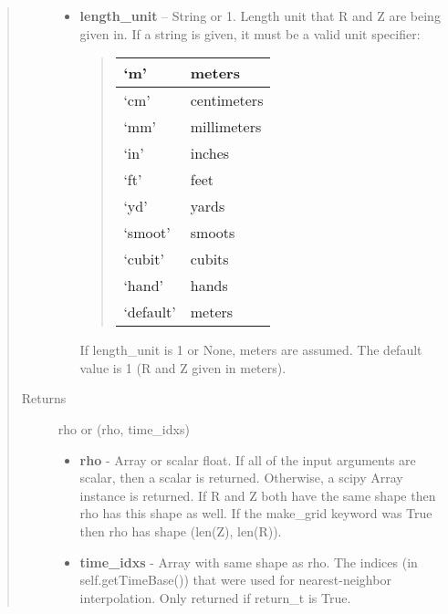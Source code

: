 \documentclass[letterpaper,10pt,english]{sphinxmanual}
\begin{document}
\begin{fulllineitems}
\begin{fulllineitems}
\begin{quote}
\begin{description}
\begin{itemize}
\item {} 
\textbf{length\_unit} --
String or 1. Length unit that R and Z are being given
in. If a string is given, it must be a valid unit specifier:
\begin{quote}

\begin{tabulary}{\linewidth}{|L|L|}
\hline

`m'
 & 
meters
\\\hline

`cm'
 & 
centimeters
\\\hline

`mm'
 & 
millimeters
\\\hline

`in'
 & 
inches
\\\hline

`ft'
 & 
feet
\\\hline

`yd'
 & 
yards
\\\hline

`smoot'
 & 
smoots
\\\hline

`cubit'
 & 
cubits
\\\hline

`hand'
 & 
hands
\\\hline

`default'
 & 
meters
\\\hline
\end{tabulary}

\end{quote}

If length\_unit is 1 or None, meters are assumed. The default
value is 1 (R and Z given in meters).

\end{itemize}

\item[{Returns}] \leavevmode

rho or (rho, time\_idxs)
\begin{itemize}
\item {} 
\textbf{rho} - Array or scalar float. If all of the input arguments are
scalar, then a scalar is returned. Otherwise, a scipy Array
instance is returned. If R and Z both have the same shape then
rho has this shape as well. If the make\_grid keyword was True
then rho has shape (len(Z), len(R)).

\item {} 
\textbf{time\_idxs} - Array with same shape as rho. The indices (in
self.getTimeBase()) that were used for nearest-neighbor
interpolation. Only returned if return\_t is True.


\end{itemize}
\end{description}
\end{quote}
\end{fulllineitems}
\end{fulllineitems}
\end{document}

